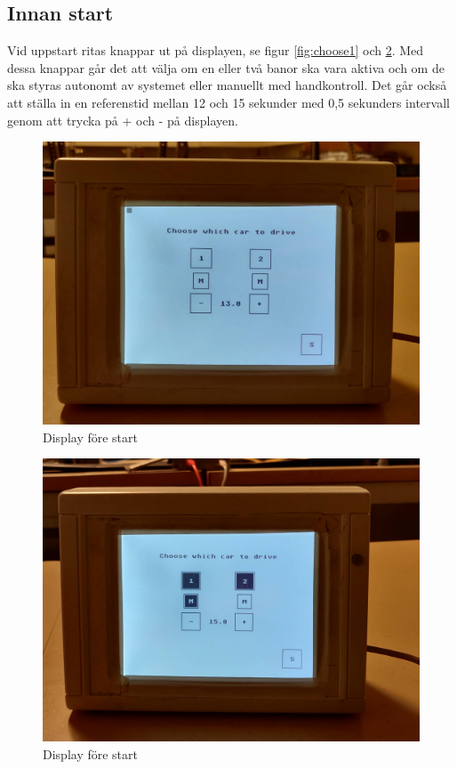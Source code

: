 \subsection{Innan start}

Vid uppstart ritas knappar ut på displayen, se figur \ref{fig:choose1} och \ref{fig:choose2}. Med dessa knappar går
det att välja om en eller två banor ska vara aktiva och om de ska styras
autonomt av systemet eller manuellt med handkontroll. Det går också att ställa
in en referenstid mellan 12 och 15 sekunder med 0,5 sekunders intervall genom
att trycka på + och - på displayen. 
\begin{figure}
	\centering
	\includegraphics[width=\linewidth] {Figures/choose1}
	\caption{Display före start}
	\label{fig:choose2}
\end{figure}
\begin{figure}
	\centering
	\includegraphics [width=\linewidth] {Figures/choose2}
	\caption{Display före start}
	\label{fig:choose2}
\end{figure}
